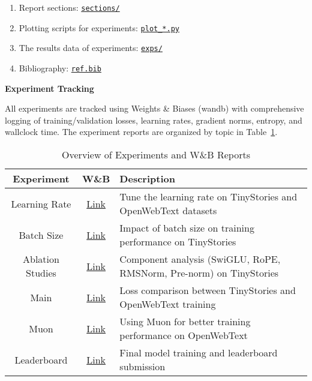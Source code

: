 \begin{enumerate}
\begin{enumerate}
        \item Report sections: \href{https://github.com/donglinkang2021/cs336-assignment1-writeup/tree/main/sections}{\lstinline{sections/}}
        \item Plotting scripts for experiments: \href{https://github.com/donglinkang2021/cs336-assignment1-writeup/tree/main/code/}{\lstinline{plot_*.py}}
        \item The results data of experiments: \href{https://github.com/donglinkang2021/cs336-assignment1-writeup/tree/main/exps}{\lstinline{exps/}}
        \item Bibliography: \href{https://github.com/donglinkang2021/cs336-assignment1-writeup/blob/main/ref.bib}{\lstinline{ref.bib}}
    \end{enumerate}
\end{enumerate}

\textbf{Experiment Tracking}

All experiments are tracked using Weights \& Biases (wandb) with comprehensive logging of training/validation losses, learning rates, gradient norms, entropy, and wallclock time. The experiment reports are organized by topic in Table~\ref{tab:experiments}.

\begin{table}[h]
\centering
\caption{Overview of Experiments and W\&B Reports}
\label{tab:experiments}
\begin{tabular}{c c l}
\toprule
\textbf{Experiment} & \textbf{W\&B} & \textbf{Description} \\
\midrule
Learning Rate & \href{https://api.wandb.ai/links/donglinkang2021-beijing-institute-of-technology/jhz7fp86}{Link} & Tune the learning rate on TinyStories and OpenWebText datasets \\
\addlinespace
Batch Size & \href{https://api.wandb.ai/links/donglinkang2021-beijing-institute-of-technology/ejo2bn9n}{Link} & Impact of batch size on training performance on TinyStories \\
\addlinespace
Ablation Studies & \href{https://api.wandb.ai/links/donglinkang2021-beijing-institute-of-technology/c54zgdnw}{Link} & Component analysis (SwiGLU, RoPE, RMSNorm, Pre-norm) on TinyStories \\
\addlinespace
Main & \href{https://api.wandb.ai/links/donglinkang2021-beijing-institute-of-technology/k1na9uic}{Link} & Loss comparison between TinyStories and OpenWebText training \\
\addlinespace
Muon & \href{https://api.wandb.ai/links/donglinkang2021-beijing-institute-of-technology/p4xh8d7y}{Link} & Using Muon for better training performance on OpenWebText \\
\addlinespace
Leaderboard & \href{https://api.wandb.ai/links/donglinkang2021-beijing-institute-of-technology/yjlpxerm}{Link} & Final model training and leaderboard submission \\
\bottomrule
\end{tabular}
\end{table}

